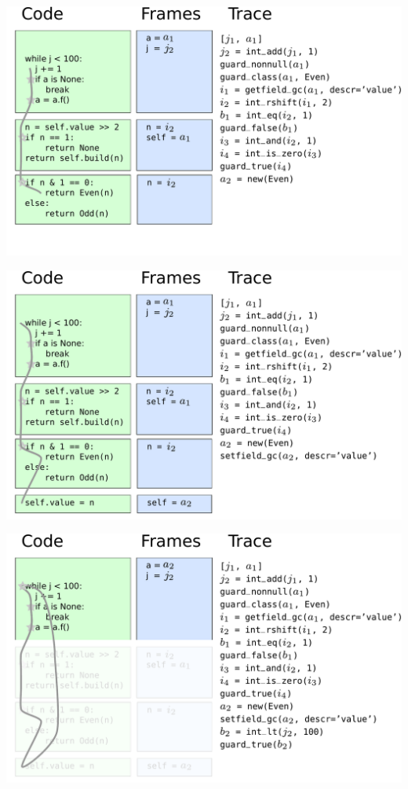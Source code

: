 \documentclass[utf8x]{beamer}
\begin{document}
\begin{frame}
  \includegraphics[scale=0.4]{figures/loop09}
\end{frame}

\begin{frame}
  \includegraphics[scale=0.4]{figures/loop10}
\end{frame}

\begin{frame}
  \includegraphics[scale=0.4]{figures/loop11}
\end{frame}
\end{document}
